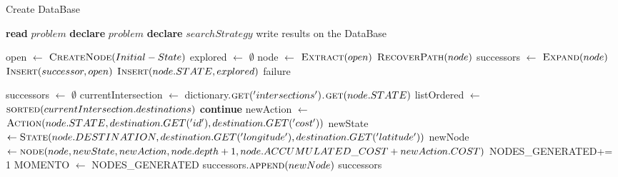 \documentclass{article}
\begin{document}
\begin{algorithm}
	\caption{Main Algorithm}
 \hfill
	\label{algo:main}
	\begin{algorithmic}[1]
		\State Create DataBase
  
				\State \textbf{read} $problem$
				\State \textbf{declare} $problem$
				\State \textbf{declare} $searchStrategy$
				\State {}
				\State write results on the DataBase
			\EndFor
		\EndFor
		\EndFunction
	\end{algorithmic}
\end{algorithm}

\begin{algorithm}
	\caption{Search Algorithm}
	\label{algo:search}
	\begin{algorithmic}[1]
		 
        \State open $\gets$ $\Call{CreateNode}{Initial-State}$
        \State explored $\gets$ $\emptyset$
        \State node $\gets$ $\Call{Extract}{open}$
            \State \Return $\Call{RecoverPath}{node}$
        \EndIf
        \State successors $\gets$ $\Call{Expand}{node}$ 
         
        \State $\Call{Insert}{successor, open}$
        \EndFor
        \State $\Call{Insert}{node.STATE, explored}$
        \EndIf
        \EndWhile
        \State \Return failure
		\EndFunction
	\end{algorithmic}
\end{algorithm}
\begin{algorithm}
	\caption{Expand Algorithm}
	\label{algo:feasibilitycheck}
	\begin{algorithmic}[1]
		 
		\State successors $\gets$ $\emptyset$
  \State currentIntersection $\gets$ dictionary.$\Call{get}{'intersections'}$.$\Call{get}{node.STATE}$
  \State listOrdered $\gets$ $\Call{sorted}{currentIntersection.destinations}$ 
   
  \State \textbf{continue}
  \EndIf
  \State newAction $\gets$ $\Call{Action}{node.STATE, destination.GET('id'),destination.GET('cost')}$
  \State newState $\gets \Call{State}{node.DESTINATION, destination.GET('longitude'),destination.GET('latitude')}$
  \State newNode $\gets \Call{node}{node, newState,newAction, node.depth+1, node.ACCUMULATED\_COST + newAction.COST}$
  \State NODES\_GENERATED+= 1
  \State MOMENTO $\gets$ NODES\_GENERATED
  \State successors.$\Call{append}{newNode}$
  \EndFor
  \State \Return successors
		\EndFunction
	\end{algorithmic}
\end{algorithm}
\end{document}
